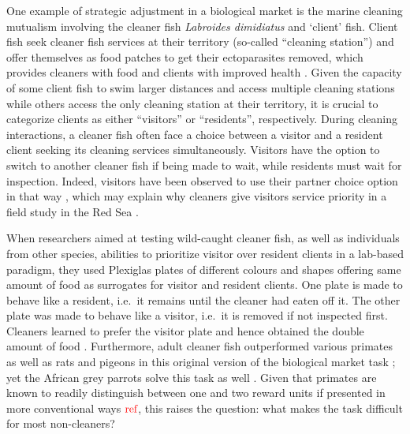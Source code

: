 \documentclass[]{rsos}%
\begin{document}
One example of strategic adjustment in a biological market is the marine
cleaning mutualism involving the cleaner fish \emph{Labroides dimidiatus} and
`client' fish. Client fish seek cleaner fish services at their territory
(so-called ``cleaning station'') and offer themselves as food patches
to get their ectoparasites removed, which provides cleaners
with food and clients with improved health \citep{waldie_LongTerm_2011, ros_Does_2011, triki_Effects_2016, demaire_Reduced_2020}.
Given the capacity of some client fish to swim larger distances and
access multiple cleaning stations while others access the only cleaning
station at their territory, it is crucial to categorize clients as
either ``visitors'' or ``residents'', respectively. During cleaning interactions,
a cleaner fish often face a choice between a visitor and a resident client
seeking its cleaning services simultaneously. Visitors have the option
to switch to another cleaner fish if being made to wait, while residents
must wait for inspection. Indeed,
visitors have been observed to use their partner choice option in that
way \citep{bshary_Choosy_2002}, which may explain why cleaners give
visitors service priority in a field study in the Red Sea
\citep{bshary_Cleaner_2001a}.

When researchers aimed at testing wild-caught cleaner fish, as
well as individuals from other species, abilities
to prioritize visitor over resident clients in a lab-based paradigm,
they used Plexiglas plates of different colours and shapes offering same
amount of food as surrogates for visitor and resident clients.
One plate is made to behave like a resident, i.e.~it remains until
the cleaner had eaten off it. The other plate was made to behave
like a visitor, i.e.~it is removed if not inspected first.
Cleaners learned to prefer the visitor plate and
hence obtained the double amount of food \citep{bshary_Asymmetric_2002}.
Furthermore, adult cleaner fish outperformed various primates as well as rats and
pigeons in this original version of the biological market task
\citep{salwiczek_Adult_2012, zentall_Early_2017}; yet the African grey
parrots solve this task as well \citep{pepperberg_Can_2014}. Given that primates
are known to readily distinguish
between one and two reward units if presented in more conventional ways
\(\color{red}{\text{ref}}\), this raises the question:
what makes the task difficult for most non-cleaners?
\end{document}
